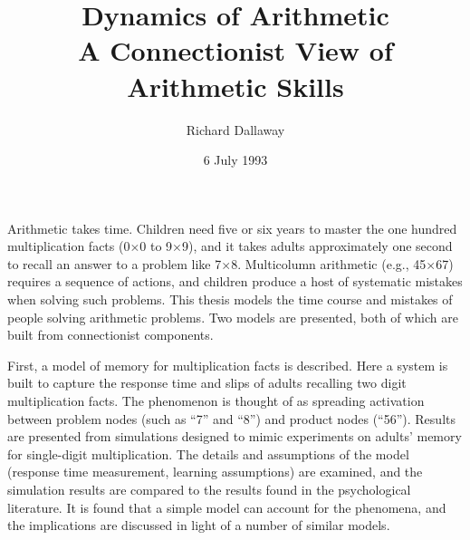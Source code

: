 
\def\x#1#2{\mbox{#1$\times$#2}}



\title{Dynamics of Arithmetic\\A Connectionist View of Arithmetic Skills}
\author{Richard Dallaway}
\date{6 July 1993}
\maketitle
\thispagestyle{empty}

\noindent Arithmetic
takes time.  Children need five or six years to master the one
hundred multiplication facts (\x00 to \x99), and it takes adults
approximately one second to recall an answer to a problem like \x78.
Multicolumn arithmetic (e.g., \x{45}{67}) requires a sequence of actions,
and children produce a host of systematic mistakes when solving such
problems. This thesis models the time course and mistakes of people solving
arithmetic problems.  Two models are presented, both of which are built
from connectionist components.

First, a model of memory for multiplication facts is described. Here a
system is built to capture the response time and slips of adults recalling
two digit multiplication facts. The phenomenon is thought of as spreading
activation between problem nodes (such as ``7'' and ``8'') and product
nodes (``56''). Results are presented from simulations designed to mimic
experiments on adults' memory for single-digit multiplication. The details
and assumptions of the model (response time measurement, learning
assumptions) are examined, and the simulation results are compared to the
results found in the psychological literature. It is found that a simple
model can account for the phenomena, and the implications are discussed in
light of a number of similar models.


